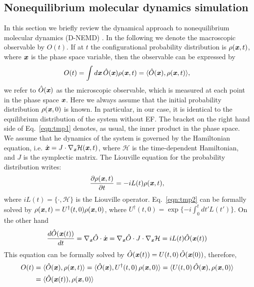 \documentclass[a4paper,preprint,unsortedaddress,onecolumn]{revtex4-1}
\newcommand{\vect}[1]{\textbf{\textit{#1}}}
\begin{document}
\subsection{Nonequilibrium molecular dynamics simulation}
In this section we briefly review the dynamical approach to nonequilibrium
molecular dynamics (D-NEMD) \cite{ciccotti1975direct, ciccotti1979thought,
  orlandini2011hydrodynamics, orlandini2011hydrodynamics-01}.
In the following we denote the macroscopic observable by $O(t)$. If at $t$
the configurational probability distribution is $\rho(\vect x, t)$, where
$\vect x$ is the phase space variable, then the observable can be
expressed by
\begin{align}\label{eqn:tmp1}
  O(t) = \int d\vect x\, \hat O(\vect x)\rho(\vect x, t)  = \langle \hat O(\vect x), \rho(\vect x, t)\rangle,
\end{align}
we refer to $\hat O (\vect x)$ as the microscopic observable, 
which is measured at each point in the phase space $\vect x$.
Here we always assume that the initial probability distribution
$\rho(\vect x, 0)$ is known. In particular, in our case,
it is identical to the equilibrium distribution of the system
without EF.
The bracket on the right hand side of Eq.~\eqref{eqn:tmp1} denotes, as usual, the inner product in the
phase space.  We assume that he dynamics of the system is governed by the
Hamiltonian equation, i.e. $\dot {\vect x} = J \cdot \nabla_{\vect x}
\mathcal H(\vect x, t)$, where $\mathcal H$ is the time-dependent Hamiltonian,
and $J$ is
the symplectic matrix. The Liouville equation for the probability
distribution writes:
\begin{align}\label{eqn:tmp2}
  \frac{\partial \rho(\vect x, t)}{\partial t} = - iL(t) \rho(\vect x, t),
\end{align}
where $iL(t) = \{\cdot, \mathcal H\}$ is the Liouville operator.
Eq.~\eqref{eqn:tmp2}
can be formally solved by $\rho(\vect x, t) = U^\dagger(t,0) \rho(\vect x, 0)$,
where $U^\dagger(t,0) = \exp\{-i \int_0^t d t' L(t')\}$.
On the other hand
\begin{align}
  \frac{d \hat O(\vect x(t))}{dt} = \nabla_{\vect x}\hat O\cdot \dot{\vect x}
  = \nabla_{\vect x}\hat O\cdot J\cdot \nabla_{\vect x}\mathcal H
  = iL(t) \hat O (\vect x(t))
\end{align}
This equation can be formally solved by
$\hat O(\vect x(t)) = U(t,0)\,\hat O(\vect x(0))$, therefore,
\begin{align}\nonumber
  O(t) & = \langle \hat O(\vect x), \rho(\vect x, t)\rangle
  = \langle \hat O(\vect x), U^\dagger(t,0)\, \rho(\vect x, 0)\rangle
  = \langle U(t,0)\,\hat O(\vect x), \rho(\vect x, 0)\rangle\\\label{eqn:tmp4}
  &= \langle \hat O(\vect x(t)), \rho(\vect x, 0)\rangle
\end{align}
\end{document}
